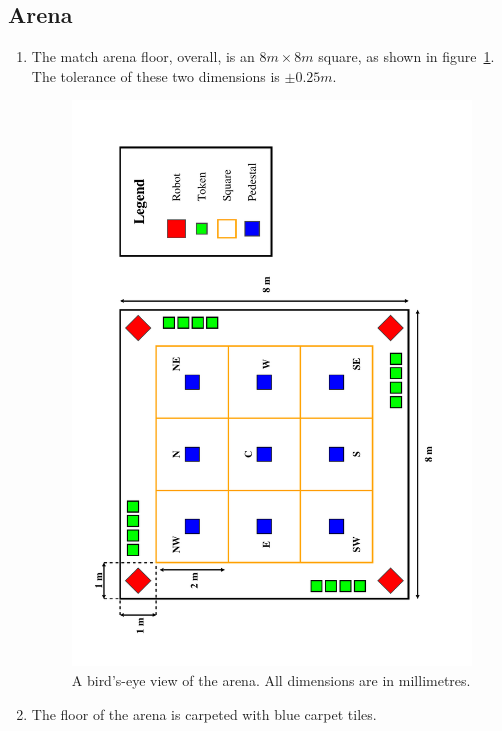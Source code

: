 \subsection{Arena}
\label{sub:arena}
\begin{enumerate}
\item The match arena floor, overall, is an $8m \times 8m$ square, as shown in figure~\ref{fig:arena-dim}.
      The tolerance of these two dimensions is $\pm0.25m$.

\begin{figure}
  \centering
  \includegraphics[width=\textwidth]{./images/arena.pdf}
  \caption{\label{fig:arena-dim}A bird's-eye view of the arena. All dimensions are in millimetres.}
\end{figure}

\item The floor of the arena is carpeted with blue carpet tiles.


\end{enumerate}
